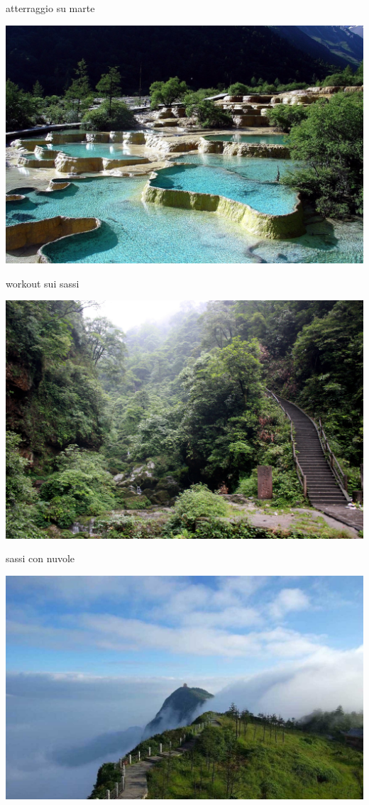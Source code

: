 \documentclass[presentation]{beamer}
\begin{document}
\begin{frame}[label={sec:org4c2ca77}]{atterraggio su marte}
\begin{center}
\includegraphics[width=.9\linewidth]{./immagini/marte_vicino.jpg}
\end{center}
\end{frame}
\begin{frame}[label={sec:org968d69e}]{workout sui sassi}
\begin{center}
\includegraphics[width=.9\linewidth]{./immagini/scale.jpg}
\end{center}
\end{frame}
\begin{frame}[label={sec:orge64d778}]{sassi con nuvole}
\begin{center}
\includegraphics[width=.9\linewidth]{./immagini/nuvole.jpg}
\end{center}
\end{frame}
\end{document}
